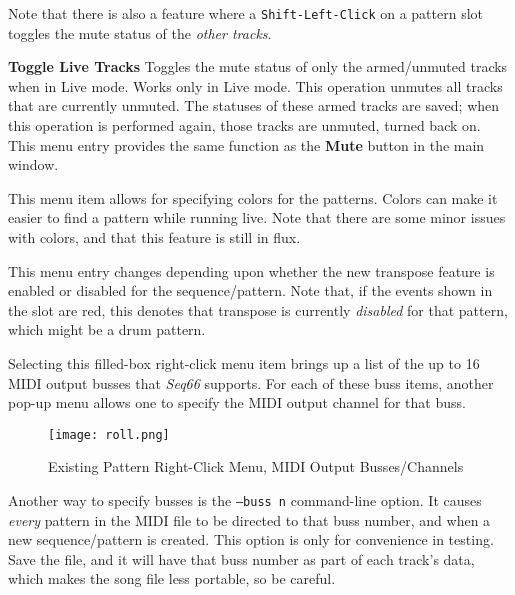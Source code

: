    Note that there is also a feature where a
   \texttt{Shift-Left-Click} on a pattern slot toggles the mute
   status of the \textsl{other tracks}.

   \textbf{Toggle Live Tracks}
   Toggles the mute status of only the armed/unmuted tracks when in Live mode.
   Works only in Live mode.  This operation unmutes all tracks that are
   currently unmuted.  The statuses of these armed tracks are saved; when
   this operation is performed again, those tracks are unmuted, turned back on.
   This menu entry provides the same function as the \textbf{Mute}
   button in the main window.

   This menu item allows for specifying colors for the patterns.
   Colors can make it easier to find a pattern while running live.
   Note that there are some minor issues with colors, and that this feature is
   still in flux.

   This menu entry changes depending upon whether the new transpose feature is
   enabled or disabled for the sequence/pattern.  Note that, if the events
   shown in the slot are red, this denotes that transpose is currently
   \textsl{disabled} for that pattern, which might be a drum pattern.

   Selecting this filled-box right-click menu item brings up a list
   of the up to 16 MIDI output busses that \textsl{Seq66} supports.
   For each of these buss items, another pop-up menu allows one
   to specify the MIDI output channel for that buss.


\begin{figure}[H]
   \centering 
   \texttt{[image: roll.png]}
   \caption{Existing Pattern Right-Click Menu, MIDI Output Busses/Channels}
   \label{fig:pattern_window_right_click_midi_bus}
\end{figure}

   Another way to specify busses is the
   \texttt{--buss n} command-line option.
   It causes \textsl{every} pattern in the MIDI
   file to be directed to that buss number, and when a new
   sequence/pattern is created.  This option is only
   for convenience in testing.  Save the file, and it will
   have that buss number as part of each track's data, which makes the song
   file less portable, so be careful.


